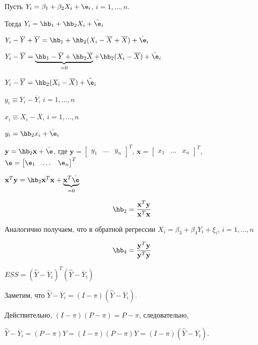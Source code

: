 \documentclass[pdftex,11pt,openany]{book}\usepackage[]{graphicx}\usepackage[]{color}
\begin{document}
\begin{solution}
Пусть $Y_i = \beta_1 + \beta_2 X_i + \e_i$, $i = 1, \ldots, n$.

Тогда $Y_i = \hb_1 + \hb_2 X_i + \hat{\e}_i$

$Y_i -  \overline{Y} + \overline{Y} = \hb_1 + \hb_2 (X_i -  \overline{X} + \overline{X}) + \hat{\e}_i$

$Y_i -  \overline{Y}  = \underbrace{\hb_1 - \overline{Y} + \hb_2 \overline{X}}_{=0} + \hb_2 (X_i -  \overline{X}) + \hat{\e}_i$

$Y_i -  \overline{Y} = \hb_2 (X_i -  \overline{X}) + \hat{\e}_i$

$y_i \equiv Y_i -  \overline{Y}$, $i = 1, \ldots, n$

$x_i \equiv X_i -  \overline{X}$, $i = 1, \ldots, n$

$y_i = \hb_2 x_i + \hat{\e}_i$

$\textbf{y} = \hb_2 \textbf{x} + \hat{\e}$, где $\textbf{y} = \begin{bmatrix}
y_1 & \ldots & y_n
\end{bmatrix}^T$, $\textbf{x} = \begin{bmatrix}
x_1 & \ldots & x_n
\end{bmatrix}^T$, $\e = \begin{bmatrix}
\e_1 & \ldots & \e_n
\end{bmatrix}^T$

$\textbf{x}^T \textbf{y} = \hb_2 \textbf{x}^T \textbf{x} + \underbrace{\textbf{x}^T \hat{\e}}_{=0}$

\begin{equation}
\label{task20:direct_ols}\hb_2 = \frac{\textbf{x}^T \textbf{y}}{\textbf{x}^T \textbf{x}}
\end{equation}

Аналогично получаем, что в обратной регрессии $X_i = \beta_3 + \beta_4 Y_i + \xi_i$, $i = 1, \ldots, n$

\begin{equation}
\label{task20:reverse_ols}\hb_4 = \frac{\textbf{y}^T \textbf{y}}{\textbf{y}^T \textbf{y}}
\end{equation}

$ESS = (\hat{Y} - \overline{Y}_i)^T(\hat{Y} - \overline{Y}_i)$

Заметим, что $\hat{Y} - \overline{Y}_i = (I - \pi)(\hat{Y} - \overline{Y}_i)$.

Действительно, $(I - \pi)(P - \pi) = P - \pi$, следовательно,

$\hat{Y} - \overline{Y}_i = (P - \pi)Y = (I - \pi)(P - \pi)Y = (I-\pi)(\hat{Y} - \overline{Y}_i)$.


\end{solution}
\end{document}
